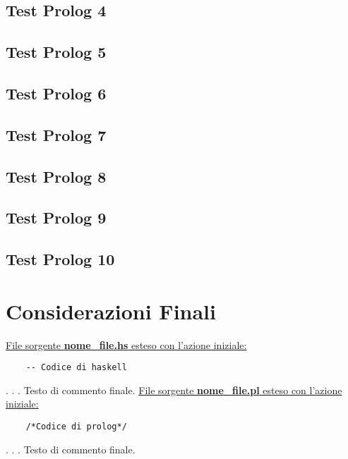 \documentclass{article}
\begin{document}
\subsection*{Test Prolog 4}
\subsection*{Test Prolog 5}
\subsection*{Test Prolog 6}
\subsection*{Test Prolog 7}
\subsection*{Test Prolog 8}
\subsection*{Test Prolog 9}
\subsection*{Test Prolog 10}
\newpage

\section{Considerazioni Finali}
\underline{File sorgente \textbf{nome\_file.hs} esteso con l'azione iniziale:}
\lstset{language=Haskell}
\begin{lstlisting}
	-- Codice di haskell
\end{lstlisting}
.
\newline
.
\newline
.
\newline
Testo di commento finale.
\newpage
\underline{File sorgente \textbf{nome\_file.pl} esteso con l'azione iniziale:}
\lstset{language=Prolog}
\begin{lstlisting}
	/*Codice di prolog*/
\end{lstlisting}
.
\newline
.
\newline
.
\newline
Testo di commento finale.
\end{document}
